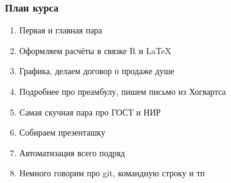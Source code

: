 \documentclass[aspectratio=169,newPxFont]{beamer}
\begin{document}
\begin{frame}
\frametitle{План курса}
\begin{enumerate}
\item  Первая и главная пара
\item  Оформляем расчёты в связке R и \LaTeX{ }
\item  Графика, делаем договор о продаже душе
\item  Подробнее про преамбулу, пишем письмо из Хогвартса
\item  Самая скучная пара про ГОСТ и НИР
\item  Собираем презенташку
\item  Автоматизация всего подряд 
\item  Немного говорим про git, командную строку и тп
\end{enumerate}
\end{frame}



%
\end{document}
